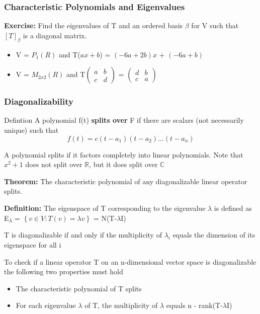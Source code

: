 \documentclass[11pt]{beamer}
\begin{document}
\begin{frame}
	\frametitle{Characteristic Polynomials and Eigenvalues}
	\textbf{Exercise: } Find the eigenvalues of T and an ordered basis $\beta$ for V such that $\left[T\right]_{\beta}$ is a diagonal matrix.
	
	\phantom{}
	
	\begin{itemize}
		\item V = $P_{1}(R)$ and T($ax+b$) = $(-6a+2b)x$ + $(-6a+b)$
		\item V = $M_{2x2}(R)$ and T$\begin{pmatrix}
										a & b \\
										c & d
									\end{pmatrix}$
			= $\begin{pmatrix}
				d & b \\
				c & a
				\end{pmatrix}$
	\end{itemize}

\end{frame}

\begin{frame}
	\frametitle{Diagonalizability}
	\begin{block}{Defintion}
		A polynomial f(t) \textbf{splits over} F if there are scalars (not necessarily unique) such that
		\[ f(t) = c(t-a_{1})(t-a_{2})\ldots(t-a_{n})\]
	\end{block}
	A polynomial splits if it factors completely into linear polynomials. Note that $x^{2}+1$ does not split over $ \mathbb{R} $, but it does split over $ \mathbb{C} $
	
	\textbf{Theorem: } The characteristic polynomial of any diagonalizable linear operator splits.
	
	

\end{frame}

\begin{frame}
	\textbf{Definition:} The eigenspace of T corresponding to the eigenvalue $\lambda$ is defined as E\textsubscript{$\lambda$} = $\left\lbrace  v \in V : T(v) = \lambda v \right\rbrace $ = N(T-$\lambda$I)
	
	\phantom{text}
	T is diagonalizable if and only if the multiplicity of $\lambda_{i}$ equals the dimension of its eigenspace for all i
	
	\phantom{text}
	
	To check if a linear operator T on an n-dimensional vector space is diagonalizable the following two properties must hold
	\begin{itemize}
		\item The characteristic polynomial of T splits
		\item For each eigenvalue $\lambda$ of T, the multiplicity of $\lambda$ equals n - rank(T-$\lambda$I)
	\end{itemize}
\end{frame}
\end{document}

